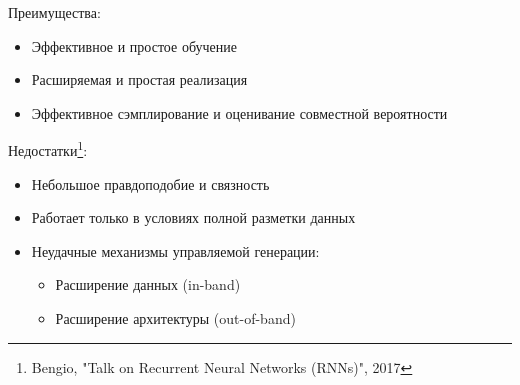 \documentclass[10pt]{beamer}
\begin{document}
\begin{frame}
Преимущества:
\begin{itemize}
    \item Эффективное и простое обучение
    \item Расширяемая и простая реализация
    \item Эффективное сэмплирование и оценивание совместной вероятности
\end{itemize}

\setcounter{footnote}{0}
Недостатки\footnote{Bengio, "Talk on Recurrent Neural Networks (RNNs)", 2017}:
\begin{itemize}
    \item Небольшое правдоподобие и связность
    \item Работает только в условиях полной разметки данных
    \item Неудачные механизмы управляемой генерации:
    \begin{itemize}
        \item Расширение данных (in-band)
        \item Расширение архитектуры (out-of-band)
    \end{itemize}
\end{itemize}

\end{frame}
\end{document}
